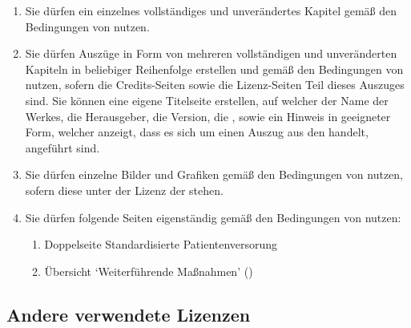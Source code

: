 \begin{enumerate}
  \item Sie dürfen ein einzelnes vollständiges  und
  unverändertes Kapitel gemäß den Bedingungen von
   nutzen.
  \item Sie dürfen Auszüge in Form von mehreren
  vollständigen und unveränderten Kapiteln in beliebiger
  Reihenfolge erstellen und gemäß den Bedingungen von  nutzen, sofern die Credits-Seiten sowie die Lizenz-Seiten Teil dieses Auszuges sind. Sie können eine eigene Titelseite
    erstellen, auf welcher der Name der Werkes, die
    Herausgeber, die Version, die {\ARGE}, sowie ein Hinweis
    in geeigneter Form, welcher anzeigt, dass es sich um
    einen Auszug aus den {\AASS} handelt, angeführt sind.
    \item Sie dürfen einzelne Bilder und Grafiken gemäß den
    Bedingungen von  nutzen, sofern
    diese unter der Lizenz der {\AASS} stehen.
    \item Sie dürfen folgende Seiten eigenständig gemäß den
    Bedingungen von  nutzen:
    \begin{enumerate}
      \item Doppelseite Standardisierte Patientenversorung
      \item Übersicht
      \enquote*{Weiterführende
      Maßnahmen} ()
    \end{enumerate}
\end{enumerate}










\subsection{Andere verwendete Lizenzen}



\noindent{}

